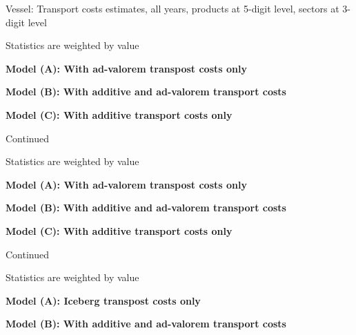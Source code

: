 \documentclass[11pt,twoside, authoryear]{elsarticle}
\begin{document}
\begin{landscape}
\begin{table}[htbp]

	\caption{Vessel: Transport costs estimates, all years, products at 5-digit level, sectors at 3-digit level}
	\begin{center}
		
		
				\begin{tablenotes}
			\tiny
			\item Statistics are weighted by value
			\item \textbf{Model (A): With ad-valorem transpost costs only}
			\item \textbf{Model (B): With additive and ad-valorem transport costs}
			\item \textbf{Model (C): With additive transport costs only}
		\end{tablenotes}

	\end{center}
\label{tab_oa:result_air_ally3}%
\end{table}%


\begin{table}[htbp]
	
	\caption{Continued}
	\begin{center}
		
		
				\begin{tablenotes}
			\tiny
			\item Statistics are weighted by value
			\item \textbf{Model (A): With ad-valorem transpost costs only}
			\item \textbf{Model (B): With additive and ad-valorem transport costs}
			\item \textbf{Model (C): With additive transport costs only}
		\end{tablenotes}
		
	\end{center}
	\label{tab_oa:result_air_ally3}%
\end{table}%


\begin{table}[htbp]
	
	\caption{Continued}
	\begin{center}
		
		
				\begin{tablenotes}
			\tiny
			\item Statistics are weighted by value
			\item \textbf{Model (A): Iceberg transpost costs only}
			\item \textbf{Model (B): With additive and ad-valorem transport costs}
		\end{tablenotes}
		

\end{center}
\end{table}
\end{landscape}
\end{document}
